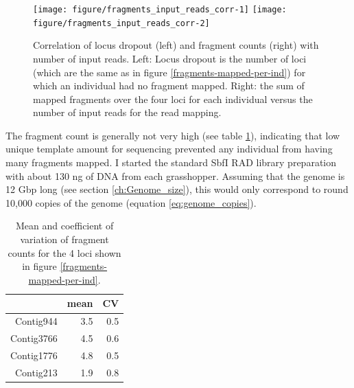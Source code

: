 \documentclass[a4paper,12pt,times,print,index,custombib,custommargin]{PhDThesisPSnPDF}\usepackage[]{graphicx}\usepackage[]{color}
\newenvironment{knitrout}{}{} %
\begin{document}
\begin{figure}
\begin{knitrout}
\color{fgcolor}

{\centering \texttt{[image: figure/fragments\_input\_reads\_corr-1]} 
\texttt{[image: figure/fragments\_input\_reads\_corr-2]} 

}



\end{knitrout}
\caption{Correlation of locus dropout (left) and fragment counts (right) with number of input reads. Left: Locus dropout is the number of loci (which are the same as in figure \ref{fragments-mapped-per-ind}) for which an individual had no \gls{fragment} mapped. Right: the sum of mapped \glspl{fragment} over the four loci for each individual versus the number of input reads for the read mapping.}
\label{frag_input_corr_fig}
\end{figure}

The \gls{fragment} count is generally not very high (see table \ref{mean_sd_fragNum_per_locus}), indicating that low unique template amount for sequencing prevented any individual from having many fragments mapped. I started the standard SbfI RAD library preparation with about 130 ng of DNA from each grasshopper. Assuming that the genome is 12 Gbp long (see section \ref{ch:Genome_size}), this would only correspond to round 10,000 copies of the genome (equation \ref{eq:genome_copies}).

\begin{table}[ht]
\centering
\caption{Mean and coefficient of variation of fragment counts for the 4 loci shown in figure \ref{fragments-mapped-per-ind}.} 
\label{mean_sd_fragNum_per_locus}
\begin{tabular}{rrr}
  \toprule
 & mean & CV \\ 
  \midrule
Contig944 & 3.5 & 0.5 \\ 
  Contig3766 & 4.5 & 0.6 \\ 
  Contig1776 & 4.8 & 0.5 \\ 
  Contig213 & 1.9 & 0.8 \\ 
   \bottomrule
\end{tabular}
\end{table}
\end{document}
